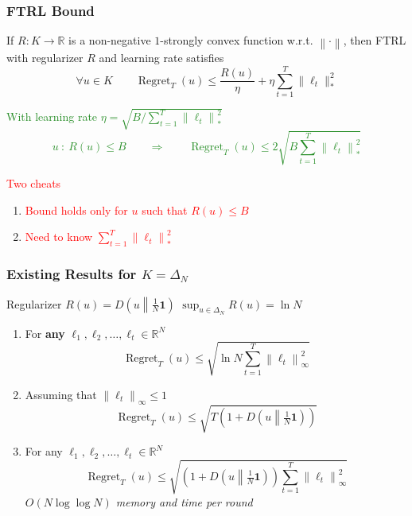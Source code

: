 \documentclass[usenames,dvipsnames]{beamer}
\DeclareMathOperator{\Regret}{Regret}
\newcommand{\R}{\mathbb{R}}
\newcommand{\indicator}{\mathbf{1}}
\newcommand{\norm}[1]{\left\|#1\right\|}
\newcommand{\KL}[2]{D\left({#1}\middle\|{#2}\right)}
\newcommand{\Cite}[1]{{\tiny \textcolor{Blue}{[#1]}}}
\begin{document}
\begin{frame}
\frametitle{FTRL Bound}

\begin{theorem}[\textcolor{Blue}{CBL'06, SS'11}]
If $R:K \to \R$ is a non-negative $1$-strongly convex function w.r.t. $\norm{\cdot}$, then FTRL
with regularizer $R$ and learning rate satisfies
$$
\forall u \in K \qquad  \Regret_T(u) \le \frac{R(u)}{\eta} + \eta \sum_{t=1}^T \|\ell_t\|_*^2
$$
\end{theorem}

\textcolor{ForestGreen}{
With learning rate $\eta = \sqrt{B/\sum_{t=1}^T \norm{\ell_t}_*^2}$
$$
u \ : \ R(u) \le B \qquad \Longrightarrow \qquad \Regret_T(u) \le 2 \sqrt{B \sum_{t=1}^T \norm{\ell_t}_*^2}
$$}

\textcolor{red}{Two cheats}
\begin{enumerate}
\item \textcolor{red}{Bound holds only for $u$ such that $R(u) \le B$}
\item \textcolor{red}{Need to know $\sum_{t=1}^T \norm{\ell_t}_*^2$}
\end{enumerate}

\end{frame}

\begin{frame}
\frametitle{Existing Results for $K=\Delta_N$}

Regularizer $R(u) = \KL{u}{\frac{1}{N} \indicator}$ \qquad $\sup_{u \in \Delta_N} R(u) = \ln N$

\vspace{0.5cm}

\begin{enumerate}

\item For \textbf{any} $\ell_1, \ell_2, \dots, \ell_t \in \R^N$ \qquad \Cite{deREGK'11, OP'15}
$$
\Regret_T(u) \le \sqrt{\ln N \sum_{t=1}^T \norm{\ell_t}_\infty^2}
$$

\item Assuming that $\norm{\ell_t}_\infty \le 1$ \qquad \Cite{CFH'09, CV'10, LS'14, LS'15, KE'15, FRS'15, OP'16}
$$
\Regret_T(u) \le \sqrt{T \left(1 + \KL{u}{\tfrac{1}{N}\indicator}\right)}
$$

\item For any $\ell_1, \ell_2, \dots, \ell_t \in \R^N$ \qquad  \Cite{FRS'15+OP'16}
$$
\Regret_T(u) \le \sqrt{(1 + \KL{u}{\tfrac{1}{N}\indicator}) \sum_{t=1}^T \norm{\ell_t}_\infty^2}
$$
\emph{$O(N \log \log N)$ memory and time per round}
\end{enumerate}
\end{frame}
\end{document}
